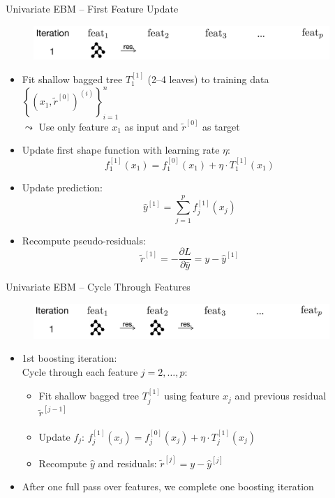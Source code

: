\documentclass[10pt,compress,t,notes=noshow, xcolor=table]{beamer}
\begin{document}
\begin{frame}{Univariate EBM – First Feature Update}
\begin{figure}
    \centering
    \includegraphics[width=\linewidth]{figure/EBM_Step1.png}
\end{figure}
\begin{itemize}
    \item Fit shallow bagged tree $T_1^{[1]}$ (2–4 leaves) to training data $\left\{\left(x_1, \tilde{r}^{[0]}\right)^{(i)}\right\}_{i=1}^n$\\
    $\leadsto$ Use only feature $x_1$ as input and $\tilde{r}^{[0]}$ as target
    \item Update first shape function with learning rate $\eta$:
    $$
    f_1^{[1]}(x_1) = f_1^{[0]}(x_1) + \eta \cdot T_1^{[1]}(x_1)
    $$
    \item Update prediction:
    $$
    \hat{y}^{[1]} = \sum_{j=1}^p f_j^{[1]}(x_j)
    $$
    \item Recompute pseudo-residuals:
    $$
    \tilde{r}^{[1]} =  -\frac{\partial L}{\partial \hat{y}} = y - \hat{y}^{[1]}
    $$
\end{itemize}

\end{frame}


\begin{frame}{Univariate EBM – Cycle Through Features}
\begin{figure}
    \centering
    \includegraphics[width=\linewidth]{figure/EBM_Step2.png}
\end{figure}
\begin{itemize}
    \item 1st boosting iteration: \\
    Cycle through each feature $j = 2,\dots,p$:
    \begin{itemize}
        \item Fit shallow bagged tree $T_j^{[1]}$ using feature $x_j$ and previous residual $\tilde{r}^{[j-1]}$ %
        \item Update $f_j$: $f_j^{[1]}(x_j) = f_j^{[0]}(x_j) + \eta \cdot T_j^{[1]}(x_j)$
        \item Recompute $\hat{y}$ and residuals: $\tilde{r}^{[j]} = y - \hat{y}^{[j]}$
    \end{itemize}
    \item After one full pass over features, we complete one boosting iteration
\end{itemize}
\end{frame}
\end{document}
